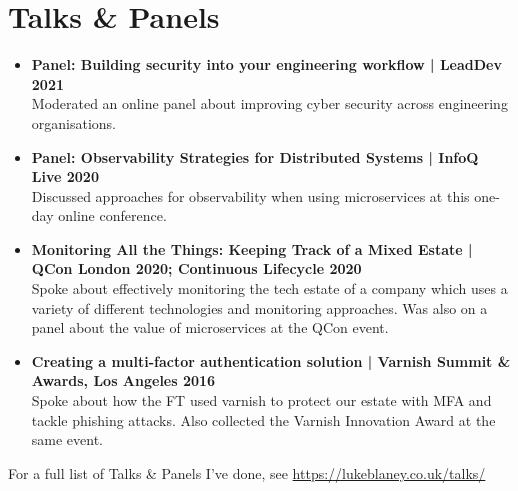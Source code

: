 \documentclass[a4paper]{article}
\begin{document}
\section*{Talks \& Panels}
\begin{itemize}

\item{\bf Panel: Building security into your engineering workflow | LeadDev 2021}\\
Moderated an online panel about improving cyber security across engineering organisations.
\item{\bf Panel: Observability Strategies for Distributed Systems | InfoQ Live 2020}\\
Discussed approaches for observability when using microservices at this one-day online conference.
\item{\bf Monitoring All the Things: Keeping Track of a Mixed Estate | QCon London 2020; Continuous Lifecycle 2020}\\
Spoke about effectively monitoring the tech estate of a company which uses a variety of different technologies and monitoring approaches.  Was also on a panel about the value of microservices at the QCon event.
\item{\bf Creating a multi-factor authentication solution | Varnish Summit \& Awards, Los Angeles 2016}\\
Spoke about how the FT used varnish to protect our estate with MFA and tackle phishing attacks.  Also collected the Varnish Innovation Award at the same event.
\end{itemize}
For a full list of Talks \& Panels I've done, see \url{https://lukeblaney.co.uk/talks/}
\end{document}
